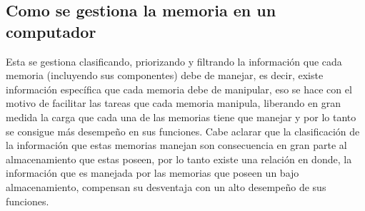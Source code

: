 \documentclass[12pt]{article}
\begin{document}
\begin{itemize}
\section{Como se gestiona la memoria en un computador}
Esta se gestiona clasificando, priorizando y filtrando la información que cada memoria (incluyendo sus componentes) debe de manejar, es decir, existe información específica que cada memoria debe de manipular, eso se hace con el motivo de facilitar las tareas que cada memoria manipula, liberando en gran medida la carga que cada una de las memorias tiene que manejar y por lo tanto se consigue más desempeño en sus funciones. Cabe aclarar que la clasificación de la información que estas memorias manejan son consecuencia en gran parte al almacenamiento que estas poseen, por lo tanto existe una relación en donde, la información que es manejada por las memorias que poseen un bajo almacenamiento, compensan su desventaja con un alto desempeño de sus funciones.
\label{conclulsion}



\end{itemize}
\end{document}
